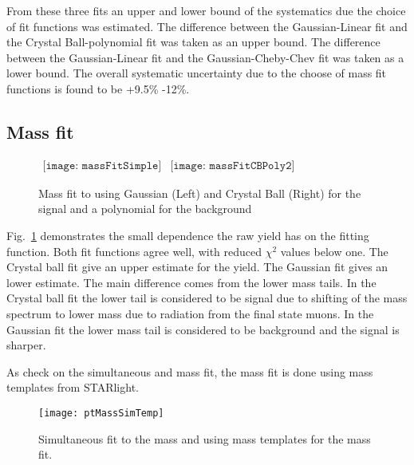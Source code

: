       From these three fits an upper and lower bound of the systematics due
        the choice of fit functions was estimated. 
      The difference between the Gaussian-Linear fit and the 
        Crystal Ball-polynomial fit was taken as an upper bound. 
      The difference between the Gaussian-Linear fit and the 
          Gaussian-Cheby-Chev fit was taken as a lower bound. 
      The overall systematic uncertainty due to the choose of mass fit 
        functions is found to be +9.5\% -12\%.

    \subsection{Mass fit}
      
      \begin{figure}[!Hhtb]
        \centering
        $ \begin{array}{cc}
          \texttt{[image: massFitSimple]} &
          \texttt{[image: massFitCBPoly2]}
        \end{array} $
        \caption{Mass fit to \JPsi{} using Gaussian (Left) and Crystal Ball (Right) for the 
          signal and a polynomial for the background}
        \label{fig:massFitSys}
      \end{figure}
      Fig.~\ref{fig:massFitSys} demonstrates the small dependence the raw 
        \JPsi{} yield has on the fitting function. 
      Both fit functions agree well, with reduced $\chi^{2}$ values below one.
      The Crystal ball fit give an upper estimate for the \JPsi{} yield.
      The Gaussian fit gives an lower estimate. 
      The main difference comes from the lower mass tails.
      In the Crystal ball fit the lower tail is considered to be signal due to 
        shifting of the mass spectrum to lower mass due to radiation from the 
        final state muons. 
      In the Gaussian fit the lower mass tail is considered to be background and 
        the signal is sharper.

      As check on the simultaneous \pt{} and mass fit, the mass fit is done
        using mass templates from STARlight.
      \begin{figure}[!Hhbt]
        \centering
        \texttt{[image: ptMassSimTemp]}
        \caption{Simultaneous fit to the mass and \pt{} using mass templates
          for the mass fit. }
        \label{fig:simFitTemp}
      \end{figure}

